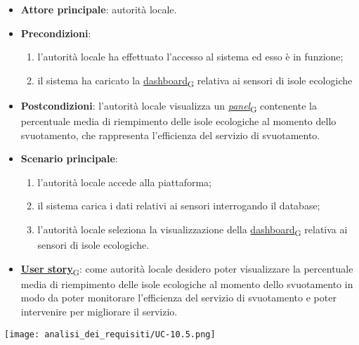 \begin{itemize}
	\item \textbf{Attore principale}: autorità locale.
	\item \textbf{Precondizioni}:
	      \begin{enumerate}
		      \item l'autorità locale ha effettuato l'accesso al sistema ed esso è in funzione;
		      \item il sistema ha caricato la \href{https://7last.github.io/docs/pb/documentazione-interna/glossario\#dashboard}{dashboard\textsubscript{G}} relativa ai sensori di isole ecologiche
	      \end{enumerate}
	\item \textbf{Postcondizioni}: l'autorità locale visualizza un \href{https://7last.github.io/docs/pb/documentazione-interna/glossario\#panel}{\textit{panel}\textsubscript{G}} contenente la percentuale media di riempimento delle isole ecologiche al momento dello svuotamento,
	      che rappresenta l'efficienza del servizio di svuotamento.
	\item \textbf{Scenario principale}:
	      \begin{enumerate}
		      \item l'autorità locale accede alla piattaforma;
		      \item il sistema carica i dati relativi ai sensori interrogando il database;
		      \item l'autorità locale seleziona la visualizzazione della \href{https://7last.github.io/docs/pb/documentazione-interna/glossario\#dashboard}{dashboard\textsubscript{G}} relativa ai sensori di isole ecologiche.
	      \end{enumerate}
	\item \href{https://7last.github.io/docs/pb/documentazione-interna/glossario\#user-story}{\textbf{User story}\textsubscript{G}}:
	      come autorità locale desidero poter visualizzare la percentuale media di riempimento delle isole ecologiche al momento dello svuotamento in modo da poter monitorare
	      l'efficienza del servizio di svuotamento e poter intervenire per migliorare il servizio.
\end{itemize}
\begin{center}
	\texttt{[image: analisi\_dei\_requisiti/UC-10.5.png]}
\end{center}

